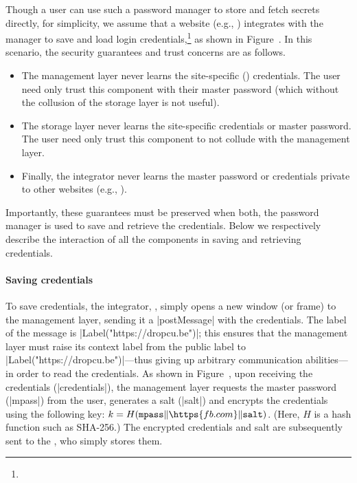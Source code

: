 %
Though a user can use such a password manager to store and fetch
secrets directly, for simplicity, we assume that a website (e.g.,
) integrates with the manager to save and load login
credentials,\footnote{
} as shown in Figure~.
%
In this scenario, the security guarantees and trust concerns are as follows.
\begin{itemize}
\item The management layer never learns the site-specific
  () credentials. The user need only trust this
  component with their master password (which without the collusion
  of the storage layer is not useful).
\item The storage layer never learns the site-specific credentials
  or master password. The user need only trust this component to
  not collude with the management layer.
\item Finally, the integrator never learns the master password or
  credentials private to other websites (e.g., ).
\end{itemize}
%
Importantly, these guarantees must be preserved when both, the
password manager is used to save and retrieve the credentials.
%
Below we respectively describe the interaction of all the components
in saving and retrieving credentials.

\paragraph{Saving credentials}
%
To save credentials, the integrator, , simply opens a
new window (or frame) to the  management layer,
sending it a \js|postMessage| with the credentials. 
%
The label of the message is \js|Label("https://dropcu.be")|; this ensures
that the management layer must raise its context label from the public
label to \js|Label("https://dropcu.be")|---thus giving up arbitrary
communication abilities---in order to read the credentials.
%
As shown in Figure~, upon receiving the
credentials (\js|credentials|), the management layer requests the
master password (\js|mpass|) from the user, generates a salt
(\js|salt|) and encrypts the credentials using the following key:
$k = H(\texttt{mpass}\|\https{fb.com}\|\texttt{salt})$.
%
(Here, $H$ is a hash function such as SHA-256.)
%
The encrypted credentials and salt are subsequently sent to the
, who simply stores them.
%


